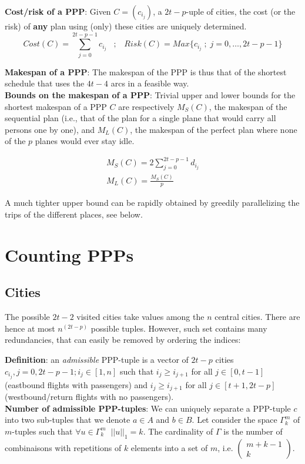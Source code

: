 \documentclass[a4paper,11pt]{article}
\begin{document}
\noindent
{\bf Cost/risk of a PPP}: Given $C = (c_{i_j})$, a $2t-p$-uple of cities, the cost (or the risk) of {\bf any} plan using (only) these cities are uniquely determined.
\[ 
Cost(C) = \sum_{j=0}^{2t-p-1} c_{i_j} \;\;\;;\;\;\; Risk(C) = Max\{c_{i_j} \;;\; j=0, \ldots, 2t-p-1\} 
\]

\noindent
{\bf Makespan of a PPP}: The makespan of the PPP is thus that of the shortest schedule that uses the $4t-4$ arcs in a feasible way. \\

\noindent
{\bf Bounds on the makespan of a PPP}: Trivial upper and lower bounds for the shortest makespan of a PPP $C$ are respectively $M_S(C)$, the makespan of the sequential plan (i.e., that of the plan for a single plane that would carry all persons one by one), and $M_L(C)$, the makespan of the perfect plan where none of the $p$ planes would ever stay idle.

\begin{eqnarray*}
 M_S(C) = 2 \sum_{j=0}^{2t-p-1} d_{i_j} \\
 M_L(C) = \frac{M_S(C)}{p}
\end{eqnarray*}

A much tighter upper bound can be rapidly obtained by greedily parallelizing the trips of the different places, see below.

\section{Counting PPPs}
\subsection{Cities}
The possible $2t-2$ visited cities  take values among the $n$ central cities.
There are hence at most $n^{(2t-p)}$ possible tuples. However, such set contains many redundancies, that can easily be removed by ordering the indices:

\noindent
{\bf Definition}: an {\it admissible} PPP-tuple is a vector of $2t-p$ cities $c_{i_j}, j=0, 2t-p-1 ; i_j\in[1,n]$ such that $i_j \geq i_{j+1}$ for all $j\in[0,t-1]$ (eastbound flights with passengers) and $i_j \geq i_{j+1}$ for all $j\in[t+1, 2t-p]$ (westbound/return flights with no passengers).\\

{\bf Number of admissible PPP-tuples}: We can uniquely separate a PPP-tuple $c$ into two sub-tuples that we denote $a\in{A}$ and $b\in{B}$. Let consider the space $\Gamma^{m}_{k}$ of $m$-tuples such that $\forall u \in \Gamma^{m}_{k} \;\; ||u||_1 = k$. The cardinality of $\Gamma$ is the number of combinaisons with repetitions of $k$ elements into a set of $m$, i.e. $\begin{pmatrix}
m+k-1\\
k
\end{pmatrix}$.\\
\end{document}
